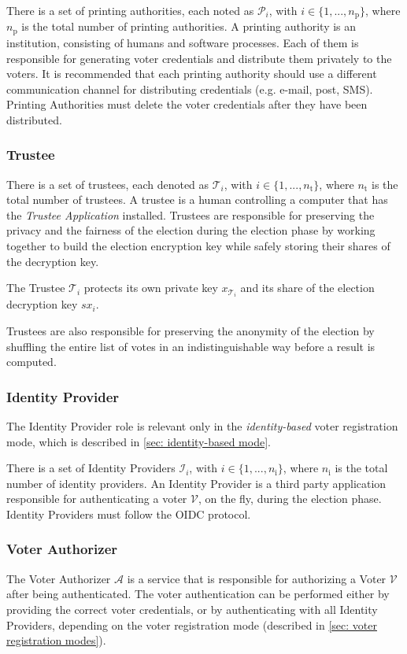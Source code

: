 There is a set of printing authorities, each noted as $\mathcal{P}_i$, with \( i \in \{ 1, ..., n_\mathrm{p} \} \), where $n_\mathrm{p}$ is the total number of printing authorities. A printing authority is an institution, consisting of humans and software processes. Each of them is responsible for generating voter credentials and distribute them privately to the voters. It is recommended that each printing authority should use a different communication channel for distributing credentials (e.g. e-mail, post, SMS). Printing Authorities must delete the voter credentials after they have been distributed.


\subsubsection{Trustee}
There is a set of trustees, each denoted as $\mathcal{T}_i$, with \( i \in \{ 1, ..., n_\mathrm{t} \} \), where $n_\mathrm{t}$ is the total number of trustees. A trustee is a human controlling a computer that has the \textit{Trustee Application} installed. Trustees are responsible for preserving the privacy and the fairness of the election during the election phase by working together to build the election encryption key while safely storing their shares of the decryption key.

The Trustee $\mathcal{T}_i$ protects its own private key $x_{\mathcal{T}_i}$ and its share of the election decryption key $sx_i$.

Trustees are also responsible for preserving the anonymity of the election by shuffling the entire list of votes in an indistinguishable way before a result is computed.


\subsubsection{Identity Provider}
The Identity Provider role is relevant only in the \textit{identity-based} voter registration mode, which is described in \cref{sec: identity-based mode}.
    
There is a set of Identity Providers $\mathcal{I}_i$, with $i \in \{ 1, ..., n_\mathrm{i} \}$, where $n_\mathrm{i}$ is the total number of identity providers. An Identity Provider is a third party application responsible for authenticating a voter $\mathcal{V}$, on the fly, during the election phase. Identity Providers must follow the OIDC protocol.


\subsubsection{Voter Authorizer} 
The Voter Authorizer $\mathcal{A}$ is a service that is responsible for authorizing a Voter $\mathcal{V}$ after being authenticated. The voter authentication can be performed either by providing the correct voter credentials, or by authenticating with all Identity Providers, depending on the voter registration mode (described in \cref{sec: voter registration modes}).

